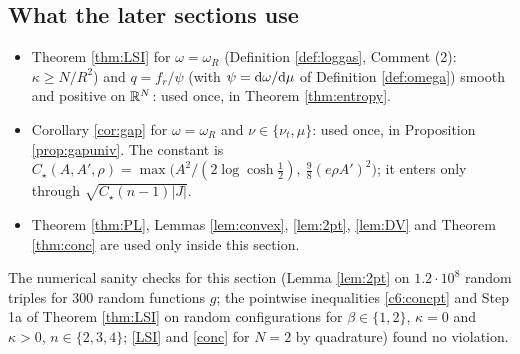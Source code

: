 \subsection{What the later sections use}\label{ss:useC6}
\begin{itemize}[leftmargin=1.6em,itemsep=1pt]
\item Theorem \ref{thm:LSI} for $\omega=\omega_R$ (Definition \ref{def:loggas}, Comment (2): $\kappa\ge N/R^2$) and $q=f_r/\psi$ (with $\psi=\mathrm{d}\omega/\mathrm{d}\mu$ of Definition \ref{def:omega}) smooth and positive on $\mathbb{R}^N$: used once, in Theorem \ref{thm:entropy}.
\item Corollary \ref{cor:gap} for $\omega=\omega_R$ and $\nu\in\{\nu_t,\mu\}$: used once, in Proposition \ref{prop:gapuniv}. The constant is $C_\star(A,A',\rho)=\max\big(A^2/(2\log\cosh\frac12),\ \frac98(e\rho A')^2\big)$; it enters only through $\sqrt{C_\star(n-1)|J|}$.
\item Theorem \ref{thm:PL}, Lemmas \ref{lem:convex}, \ref{lem:2pt}, \ref{lem:DV} and Theorem \ref{thm:conc} are used only inside this section.
\end{itemize}
The numerical sanity checks for this section (Lemma \ref{lem:2pt} on $1.2\cdot10^8$ random triples for 300 random functions $g$; the pointwise inequalities \eqref{c6:concpt} and Step 1a of Theorem \ref{thm:LSI} on random configurations for $\beta\in\{1,2\}$, $\kappa=0$ and $\kappa>0$, $n\in\{2,3,4\}$; \eqref{LSI} and \eqref{conc} for $N=2$ by quadrature) found no violation.
